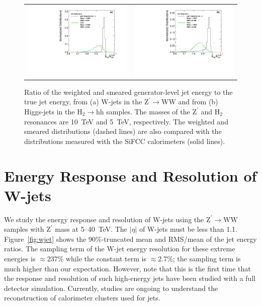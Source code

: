 \documentclass{PoS}
\begin{document}
\begin{figure}
\begin{center}
\begin{tabular}{cc}
\includegraphics[width=.4\textwidth]{figs/ZprimeWW_radius0p4_h_jeratio_gen_response.pdf} &
\includegraphics[width=.4\textwidth]{figs/2HDM_radius0p4_h_jeratio_gen_response.pdf} \\
\end{tabular}
\end{center}
\caption{Ratio of the weighted and smeared generator-level jet energy to 
 the true jet energy, from (a) W-jets in the 
$\mathrm{Z}^{\prime}\rightarrow \mathrm{WW}$ and from (b) Higgs-jets in 
the $\mathrm{H}_2\rightarrow \mathrm{hh}$ samples. The masses 
of the $\mathrm{Z}^{\prime}$ and $\mathrm{H}_2$ resonances 
are 10~TeV and 5~TeV, respectively. The weighted and smeared distributions 
(dashed lines) are also compared with the distributions measured 
with the SiFCC calorimeters (solid lines).}
\label{fig:weight}
\end{figure}


\section{Energy Response and Resolution of W-jets \label{sec:jetresponse}}
We study the energy response and resolution of W-jets using the 
$\mathrm{Z}^{\prime}\rightarrow \mathrm{WW}$ samples with $\mathrm{Z}^{\prime}$ 
mass at 5--40~TeV. The $\left|\eta\right|$ of W-jets must be less than 1.1. 
Figure~\ref{fig:wjet} shows the 90\%-truncated mean and RMS/mean of the jet 
energy ratios. 
The sampling term of the W-jet energy resolution for these extreme energies 
is $\approx 237\%$ while the constant term is $\approx$2.7\%;
the sampling term is much higher than our expectation. 
However, note that this is the first time that the response and resolution of 
such high-energy jets have been studied with a full detector simulation. 
Currently, studies are ongoing to understand the reconstruction
of calorimeter clusters used for jets. 
\end{document}

